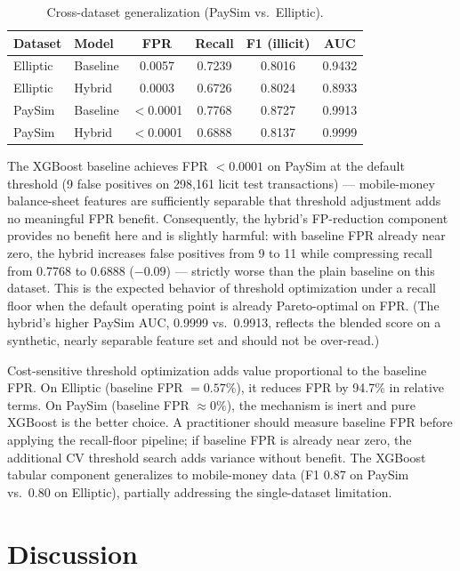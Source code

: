 \documentclass[11pt]{article}
\begin{document}
\begin{table}[h]
\centering
\caption{Cross-dataset generalization (PaySim vs.\ Elliptic).}
\begin{tabular}{llcccc}
\toprule
Dataset & Model & FPR & Recall & F1 (illicit) & AUC \\
\midrule
Elliptic & Baseline & 0.0057 & 0.7239 & 0.8016 & 0.9432 \\
Elliptic & Hybrid   & 0.0003 & 0.6726 & 0.8024 & 0.8933 \\
PaySim   & Baseline & $<$0.0001 & 0.7768 & 0.8727 & 0.9913 \\
PaySim   & Hybrid   & $<$0.0001 & 0.6888 & 0.8137 & 0.9999 \\
\bottomrule
\end{tabular}
\end{table}

The XGBoost baseline achieves FPR $< 0.0001$ on PaySim at the default threshold (9 false positives on 298,161 licit test transactions) --- mobile-money balance-sheet features are sufficiently separable that threshold adjustment adds no meaningful FPR benefit. Consequently, the hybrid's FP-reduction component provides no benefit here and is slightly harmful: with baseline FPR already near zero, the hybrid increases false positives from 9 to 11 while compressing recall from 0.7768 to 0.6888 ($-0.09$) --- strictly worse than the plain baseline on this dataset. This is the expected behavior of threshold optimization under a recall floor when the default operating point is already Pareto-optimal on FPR. (The hybrid's higher PaySim AUC, 0.9999 vs.\ 0.9913, reflects the blended score on a synthetic, nearly separable feature set and should not be over-read.)

Cost-sensitive threshold optimization adds value proportional to the baseline FPR. On Elliptic (baseline FPR $= 0.57\%$), it reduces FPR by 94.7\% in relative terms. On PaySim (baseline FPR $\approx 0\%$), the mechanism is inert and pure XGBoost is the better choice. A practitioner should measure baseline FPR before applying the recall-floor pipeline; if baseline FPR is already near zero, the additional CV threshold search adds variance without benefit. The XGBoost tabular component generalizes to mobile-money data (F1 0.87 on PaySim vs.\ 0.80 on Elliptic), partially addressing the single-dataset limitation.

\section{Discussion}
\end{document}
